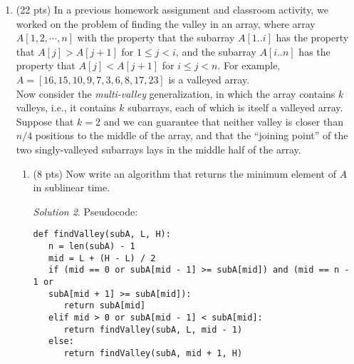 \documentclass[12pt]{article}
\theoremstyle{remark}
\newtheorem*{solution}{Solution}
\begin{document}
\begin{enumerate}
\begin{enumerate}
\begin{solution}
\begin{verbatim}
   for i in range(len(arr)):
      for j in range(i, len(arr)):
         if i + 2 <= j:
            select dpTable[i + 2][j]
         if i + 1 <= j - 1:
            select dpTable[i + 1][j - 1]
         if i <= j - 2:
            select dpTable[i][j - 1]

         dpTable[i][j] = min of the three options

   return dpTable[0][len(arr) - 1]
\end{verbatim}
    \end{solution}
    \pagebreak

\item (15 pts) Implement your strategy and the greedy strategy in Python and include code to simulate a game. Your simulation work for up to 100 cards, and values ranging from 1 to 100. Your simulation should include a randomly generated collection of cards and show the sum of cards in each hand at the end of the game. 
\end{enumerate}

\pagebreak
\item (22 pts) 
	In a previous homework assignment and classroom activity, we worked on the problem of finding the valley in an array, where array $A[1, 2, \cdots, n]$ with the property that the subarray $A[1..i]$ has the property that $A[j]>A[j+1]$ for $1\leq j< i$, and the subarray $A[i..n]$ has the property that $A[j]<A[j+1]$ for $i\leq j < n$. For example, $A=[16, 15, 10, 9, 7, 3, 6, 8, 17, 23]$ is a valleyed array.\\
	
	Now consider the \textit{multi-valley} generalization, in which the array contains $k$ valleys, i.e., it contains $k$ subarrays, each of which is itself a valleyed array. Suppose that $k=2$ and we can guarantee that neither valley is closer than $n/4$ positions to the middle of the array, and that the ``joining point'' of the two singly-valleyed subarrays lays in the middle half of the array. 
	\begin{enumerate}
	    \item (8 pts) Now write an algorithm that returns the minimum element of $A$ in sublinear time.
	    \begin{solution} Pseudocode: \\
\begin{verbatim}
def findValley(subA, L, H):
   n = len(subA) - 1
   mid = L + (H - L) / 2
   if (mid == 0 or subA[mid - 1] >= subA[mid]) and (mid == n - 1 or
   subA[mid + 1] >= subA[mid]):
      return subA[mid]
   elif mid > 0 or subA[mid - 1] < subA[mid]:
      return findValley(subA, L, mid - 1)
   else:
      return findValley(subA, mid + 1, H)


\end{verbatim}
\end{solution}
\end{enumerate}
\end{enumerate}
\end{document}
